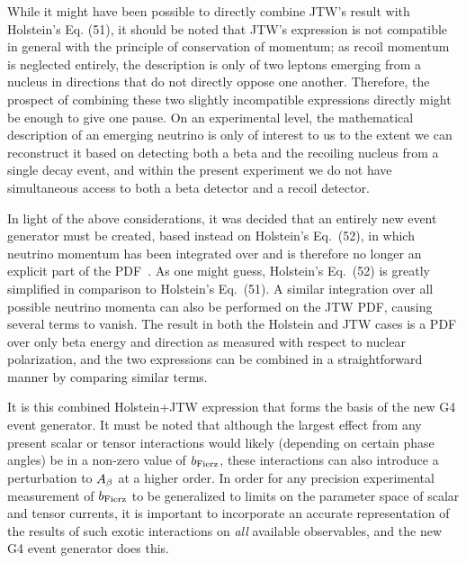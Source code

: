 While it might have been possible to directly combine JTW's result with Holstein's Eq. (51), it should be noted that JTW's expression is not compatible in general with the principle of conservation of momentum;  as recoil momentum is neglected entirely, the description is only of two leptons emerging from a nucleus in directions that do not directly oppose one another.  Therefore, the prospect of combining these two slightly incompatible expressions directly might be enough to give one pause.  On an experimental level, the mathematical description of an emerging neutrino is only of interest to us to the extent we can reconstruct it based on detecting both a beta and the recoiling nucleus from a single decay event, and within the present experiment we do not have simultaneous access to both a beta detector and a recoil detector.  

In light of the above considerations, it was decided that an entirely new event generator must be created, based instead on Holstein's Eq.~(52), in which neutrino momentum has been integrated over and is therefore no longer an explicit part of the PDF~\cite{holstein}.  As one might guess, Holstein's Eq.~(52) is greatly simplified in comparison to Holstein's Eq.~(51).  A similar integration over all possible neutrino momenta can also be performed on the JTW PDF, causing several terms to vanish.  The result in both the Holstein and JTW cases is a PDF over only beta energy and direction as measured with respect to nuclear polarization, and the two expressions can be combined in a straightforward manner by comparing similar terms.  

It is this combined Holstein+JTW expression that forms the basis of the new G4 event generator.  It must be noted that although the largest effect from any present scalar or tensor interactions would likely (depending on certain phase angles) be in a non-zero value of $b_{\mathrm{Fierz}}$, these interactions can also introduce a perturbation to $A_{\beta}$ at a higher order.  In order for any precision experimental measurement of $b_{\mathrm{Fierz}}$ to be generalized to limits on the parameter space of scalar and tensor currents, it is important to incorporate an accurate representation of the results of such exotic interactions on \emph{all} available observables, and the new G4 event generator does this.  


